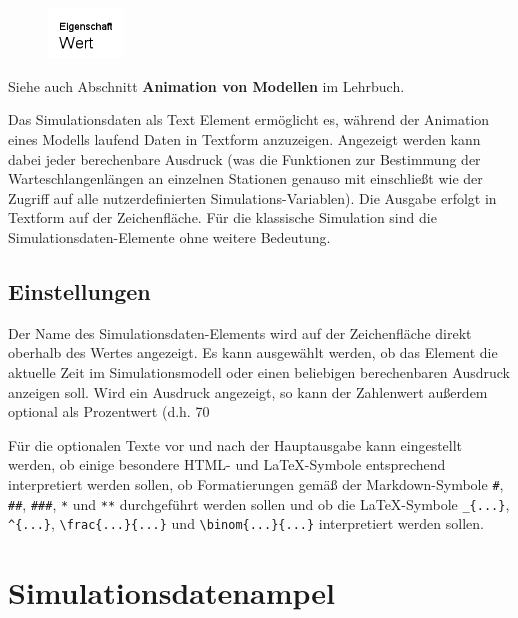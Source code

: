 \begin{figure}
\vspace{-22pt}
\includegraphics[width=2cm]{imageModelElementAnimationText.png}
\vspace{-22pt}
\end{figure}

Siehe auch Abschnitt \textbf{Animation von Modellen} im Lehrbuch.

Das Simulationsdaten als Text Element ermöglicht es, während der Animation eines Modells laufend Daten in Textform anzuzeigen.
Angezeigt werden kann dabei jeder berechenbare Ausdruck (was die Funktionen zur Bestimmung der Warteschlangenlängen
an einzelnen Stationen genauso mit einschließt wie der Zugriff auf alle nutzerdefinierten Simulations-Variablen).
Die Ausgabe erfolgt in Textform auf der Zeichenfläche. Für die klassische Simulation sind die Simulationsdaten-Elemente
ohne weitere Bedeutung.

\subsection*{Einstellungen}

Der Name des Simulationsdaten-Elements wird auf der Zeichenfläche direkt oberhalb des Wertes angezeigt.
Es kann ausgewählt werden, ob das Element die aktuelle Zeit im Simulationsmodell oder einen beliebigen
berechenbaren Ausdruck anzeigen soll. Wird ein Ausdruck angezeigt, so kann der Zahlenwert außerdem optional
als Prozentwert (d.h. 70%

Für die optionalen Texte vor und nach der Hauptausgabe kann eingestellt werden, ob einige besondere HTML- und LaTeX-Symbole entsprechend
interpretiert werden sollen, ob Formatierungen gemäß der Markdown-Symbole \texttt{\#}, \texttt{\#\#}, \texttt{\#\#\#}, \texttt{*}
und \texttt{**} durchgeführt werden sollen und ob die LaTeX-Symbole \texttt{\_\{...\}}, \texttt{\^{}\{...\}},
\texttt{\textbackslash frac\{...\}\{...\}} und \texttt{\textbackslash binom\{...\}\{...\}} interpretiert werden sollen.


\section{Simulationsdatenampel}
\label{ref:ModelElementAnimationTrafficLights}

